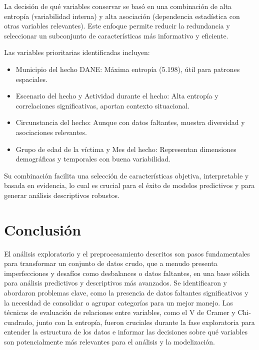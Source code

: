\documentclass[lettersize,journal]{IEEEtran}
\begin{document}
La decisión de qué variables conservar se basó en una combinación de alta entropía (variabilidad interna) y alta asociación (dependencia estadística con otras variables relevantes). Este enfoque permite reducir la redundancia y seleccionar un subconjunto de características más informativo y eficiente.

Las variables prioritarias identificadas incluyen:

\begin{itemize}
    \item Municipio del hecho DANE: Máxima entropía (5.198), útil para patrones espaciales.
    \item Escenario del hecho y Actividad durante el hecho: Alta entropía y correlaciones significativas, aportan contexto situacional.
    \item Circunstancia del hecho: Aunque con datos faltantes, muestra diversidad y asociaciones relevantes.
    \item Grupo de edad de la víctima y Mes del hecho: Representan dimensiones demográficas y temporales con buena variabilidad.
\end{itemize}

Su combinación facilita una selección de características objetiva, interpretable y basada en evidencia, lo cual es crucial para el éxito de modelos predictivos y para generar análisis descriptivos robustos.

\section{Conclusión}

El análisis exploratorio y el preprocesamiento descritos son pasos fundamentales para transformar un conjunto de datos crudo, que a menudo presenta imperfecciones y desafíos como desbalances o datos faltantes, en una base sólida para análisis predictivos y descriptivos más avanzados. Se identificaron y abordaron problemas clave, como la presencia de datos faltantes significativos y la necesidad de consolidar o agrupar categorías para un mejor manejo. Las técnicas de evaluación de relaciones entre variables, como el V de Cramer y Chi-cuadrado, junto con la entropía, fueron cruciales durante la fase exploratoria para entender la estructura de los datos e informar las decisiones sobre qué variables son potencialmente más relevantes para el análisis y la modelización.
\end{document}
